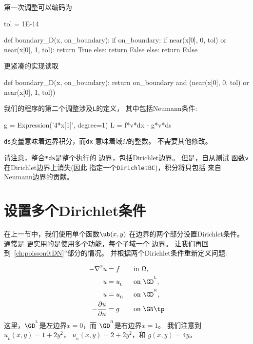 \noindent
第一次调整可以编码为

\begin{python}
tol = 1E-14

def boundary_D(x, on_boundary):
    if on_boundary:
        if near(x[0], 0, tol) or near(x[0], 1, tol):
            return True
        else:
            return False
    else:
        return False
\end{python}
更紧凑的实现读取

\begin{python}
def boundary_D(x, on_boundary):
    return on_boundary and (near(x[0], 0, tol) or near(x[0], 1, tol))
\end{python}


我们的程序的第二个调整涉及\texttt{L}的定义，
其中包括Neumann条件:

\begin{python}
g = Expression('4*x[1]', degree=1)
L = f*v*dx - g*v*ds
\end{python}
\texttt{ds}变量意味着边界积分，而\texttt{dx}
意味着域$\Omega$的整数。
不需要其他修改。

请注意，整合\texttt{*ds}是整个执行的
边界，包括Dirichlet边界。 但是，自从测试
函数\texttt{v}在Dirichlet边界上消失(因此
指定一个\texttt{DirichletBC})，积分将只包括
来自Neumann边界的贡献。

\section{设置多个Dirichlet条件}
\label{ch:poisson0:multiple:Dirichlet}

在上一节中，我们使用单个函数$\ub(x,y)$
在边界的两个部分设置Dirichlet条件。 通常是
更实用的是使用多个功能，每个子域一个
边界。 让我们再回到~\ref{ch:poisson0:DN}”部分的情况。
并根据两个Dirichlet条件重新定义问题:

\begin{alignat*}{2}
    - \nabla^2 u &= f \quad&&\mbox{in } \Omega, \\
    u &= u_{_\mathrm{L}} &&\mbox{on } \GD^{^{\mathrm{L}}}, \\
    u &= u_{_\mathrm{R}} &&\mbox{on } \GD^{^{\mathrm{R}}}, \\
    - {\partial u\over\partial n} &= g &&\mbox{on } \GN \tp
\end{alignat*}
这里，$\GD^{^{\mathrm{L}}}$是左边界$x=0$，而
$\GD^{^{\mathrm{R}}}$是右边界$x=1$。 我们注意到
$u_{_\mathrm{L}}(x, y) = 1 + 2y^2$，
$u_{_\mathrm{R}}(x, y) = 2 + 2y^2$，和
$g(x, y)=4y$。

